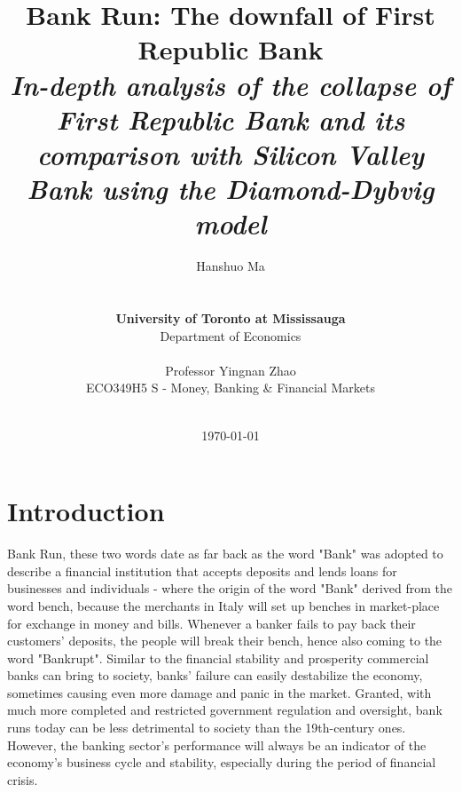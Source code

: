 \documentclass[a4paper]{article}
\begin{document}
\title{{\Huge \textbf{Bank Run: The downfall of First Republic Bank}{\large\linebreak\\}}{\Large \textit{In-depth analysis of the collapse of First Republic Bank and its comparison with Silicon Valley Bank using the Diamond-Dybvig model}\linebreak\linebreak}}

\author{Hanshuo Ma
\\ \\ \\
\textbf{University of Toronto at Mississauga} \\
Department of Economics \\ \\
Professor Yingnan Zhao \\
ECO349H5 S - Money, Banking \& Financial Markets \\ \\}
\date{\today}

\maketitle

\newpage
\tableofcontents\label{c}
\newpage

\section{Introduction} \label{Introduction}
\vspace{-0.25cm}

\quad \quad Bank Run, these two words date as far back as the word "Bank" was adopted to describe a financial institution that accepts deposits and lends loans for businesses and individuals - where the origin of the word "Bank" derived from the word bench, because the merchants in Italy will set up benches in market-place for exchange in money and bills. Whenever a banker fails to pay back their customers' deposits, the people will break their bench, hence also coming to the word "Bankrupt". Similar to the financial stability and prosperity commercial banks can bring to society, banks' failure can easily destabilize the economy, sometimes causing even more damage and panic in the market. Granted, with much more completed and restricted government regulation and oversight, bank runs today can be less detrimental to society than the 19th-century ones. However, the banking sector's performance will always be an indicator of the economy's business cycle and stability, especially during the period of financial crisis. 
\end{document}
